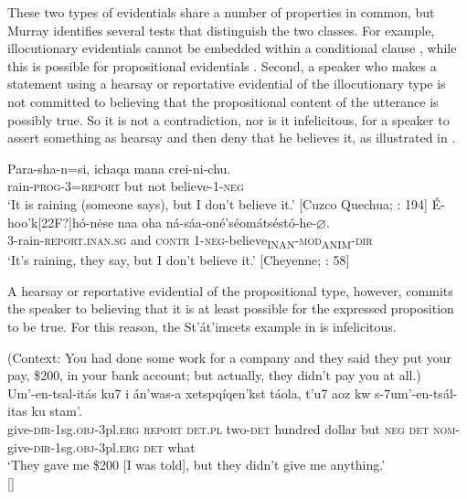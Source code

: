 These two types of evidentials share a number of properties in common, but Murray identifies several tests that distinguish the two classes. For example, illocutionary evidentials cannot be embedded within a conditional clause , while this is possible for propositional evidentials . Second, a speaker who makes a statement using a hearsay or reportative evidential of the illocutionary type is not committed to believing that the propositional content of the utterance is possibly true. So it is not a contradiction, nor is it infelicitous, for a speaker to assert something as hearsay and then deny that he believes it, as illustrated in .


\ea
\ea \gll Para-sha-n=si,  ichaqa  mana  crei-ni-chu.\\
rain-\textsc{prog}-3=\textsc{report}  but  not  believe-1-\textsc{neg}\\
\glt ‘It is raining (someone says), but I don’t believe it.’ [Cuzco Quechua; \citealt{Faller2002}: 194]
\ex \gll  É-hoo'k[22F?]hó-n\.ese  naa  oha  ná-sáa-oné'séomátséstó-he-⌀.\\
3-rain-\textsc{report}.\textsc{inan.sg}  and  \textsc{contr}  1-\textsc{neg}-believe\textsubscript{INAN}-\textsc{mod\textsubscript{A}}\textsubscript{NIM}-\textsc{dir}\\
\glt ‘It’s raining, they say, but I don’t believe it.’  [Cheyenne; \citealt{Murray2010}: 58]
\z \z


A hearsay or reportative evidential of the propositional type, however, commits the speaker to believing that it is at least possible for the expressed proposition to be true. For this reason, the St’át’imcets example in  is infelicitous.


\ea
(Context: You had done some work for a company and they said they put your pay, \$200, in your bank account; but actually, they didn’t pay you at all.)\\
\gll *Um’-en-tsal-itás  ku7  i  án’was-a  xetspqíqen’kst  táola, t’u7  aoz  kw  s-7um’-en-tsál-itas  ku  stam’.\\
 give-\textsc{dir}-1sg.\textsc{obj}-3pl.\textsc{erg}  \textsc{report}  \textsc{det.pl}  two-\textsc{det}  hundred  dollar but  \textsc{neg}  \textsc{det}  \textsc{nom}-give-\textsc{dir}-1sg.\textsc{obj}-3pl.\textsc{erg}  \textsc{det}  what\\
\glt ‘They gave me \$200 [I was told], but they didn’t give me anything.’\\
   {}[\citealt{Matthewsonetal2007}]
\z


